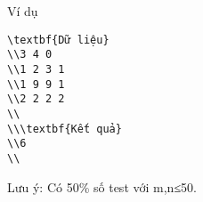 Ví dụ
\begin{verbatim}
\textbf{Dữ liệu}
\\3 4 0
\\1 2 3 1
\\1 9 9 1
\\2 2 2 2	
\\
\\\textbf{Kết quả}
\\6
\\\end{verbatim}

   Lưu ý: Có 50\% số test với m,n≤50.